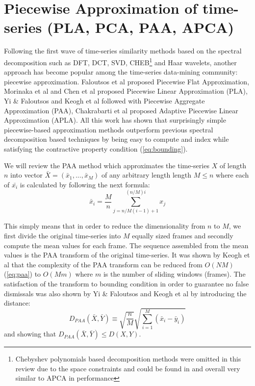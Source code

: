 \section{Piecewise Approximation of time-series (PLA, PCA, PAA, APCA)}
Following the first wave of time-series similarity methods based on the spectral decomposition such as DFT, DCT, SVD, CHEB\footnote{Chebyshev polynomials based decomposition methods were omitted in this review due to the space constraints and could be found in \cite{citeulike:2753031} and overall very similar to APCA in performance}
and Haar wavelets, another approach has become popular among the time-series data-mining community: piecewise approximation. Faloutsos et al \cite{citeulike:4344279} proposed Piecewise Flat Approximation, Morinaka et al \cite{citeulike:4295248} and Chen et al \cite{citeulike:4165220} proposed Piecewise Linear Approximation (PLA), Yi \& Faloutsos \cite{citeulike:2946589} and Keogh et al \cite{citeulike:3000416} followed with Piecewise Aggregate Approximation (PAA), Chakrabarti et al \cite{citeulike:1736140} proposed Adaptive Piecewise Linear Approximation (APLA). All this work has shown that surprisingly simple piecewise-based approximation methods outperform previous spectral decomposition based techniques by being easy to compute and index while satisfying the contractive property condition (\ref{eq:bounding}).

We will review the PAA method which approximates the time-series $X$ of length $n$ into vector $\bar{X} = ( \bar{x}_{1}, ..., \bar{x}_{M} )$ of any arbitrary length length $M \leq n$ where each of $\bar{x_{i}}$ is calculated by following the next formula:
\begin{equation}
\bar{x}_{i} = \frac{M}{n} \sum_{j=n/M(i-1)+1}^{(n/M)i} x_{j}
\label{eq:paa}
\end{equation}

This simply means that in order to reduce the dimensionality from $n$ to $M$, we first divide the original time-series into $M$ equally sized frames and secondly compute the mean values for each frame. The sequence assembled from the mean values is the PAA transform of the original time-series. It was shown by Keogh et al that the complexity of the PAA transform can be reduced from $O(NM)$ (\ref{eq:paa}) to $O(Mm)$ where $m$ is the number of sliding windows (frames). The satisfaction of the transform to bounding condition in order to guarantee no false dismissals was
also shown by Yi \& Faloutsos and Keogh et al by introducing the distance:
\begin{equation}
D_{PAA}(\bar{X}, \bar{Y}) \equiv \sqrt{\frac{n}{M}} \sqrt{ \sum_{i=1}^{M} 
\left(  \bar{x}_{i} - \bar{y}_{i} \right)}
\label{eq:paa_distnace}
\end{equation}
and showing that $D_{PAA}(\bar{X}, \bar{Y}) \leq D(X,Y)$.

